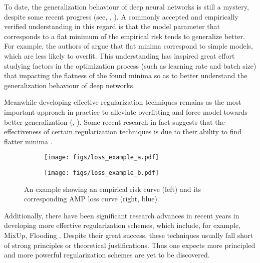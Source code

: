 \documentclass[final]{cvpr}
\begin{document}
To date, the generalization behaviour of deep neural networks is still a mystery, despite some recent progress (see, \eg, \cite{arora2019fine,belkin2019reconciling,hochreiter1997flat,jacot2018neural,keskar2017large,yang2020rethinking,zhang2017understanding}). A commonly accepted and empirically verified understanding in this regard is that the model parameter that corresponds to a flat minimum of the empirical risk tends to generalize better. For example, the authors of \cite{hochreiter1997flat,keskar2017large} argue that flat minima correspond to simple models, which are less likely to overfit. This understanding has inspired great effort studying factors in the optimization process (such as learning rate and batch size) that impacting the flatness of the found minima \cite{goyal2017accurate,hoffer2017train,jastrzkebski2017three} so as to better understand the generalization behaviour of deep networks.

Meanwhile developing effective regularization techniques remains as the most important approach in practice to alleviate overfitting and force model towards better generalization (\eg, \cite{guo2019mixup,krizhevsky2012imagenet,krogh1992simple,srivastava2014dropout,szegedy2016rethinking,zhang2018mixup}). Some recent research in fact suggests that the effectiveness of certain regularization techniques is due to their ability to find flatter minima \cite{ishida2020we,wei2020implicit}.

\begin{figure}[t]
\centering
\begin{subfigure}{0.48\columnwidth}\centering \texttt{[image: figs/loss\_example\_a.pdf]}\end{subfigure}\begin{subfigure}{0.48\columnwidth}\centering \texttt{[image: figs/loss\_example\_b.pdf]}\end{subfigure}\caption{An example showing an empirical risk curve (left) and its corresponding AMP loss curve (right, blue).}
\label{fig:motivation}
\end{figure}

Additionally, there have been significant research advances in recent years in developing more effective regularization schemes, which include, for example, MixUp, Flooding \cite{ishida2020we,zhang2018mixup}. Despite their great success, these techniques usually fall short of strong principles or theoretical justifications. Thus one expects more principled and more powerful regularization schemes are yet to be discovered. 
\end{document}
